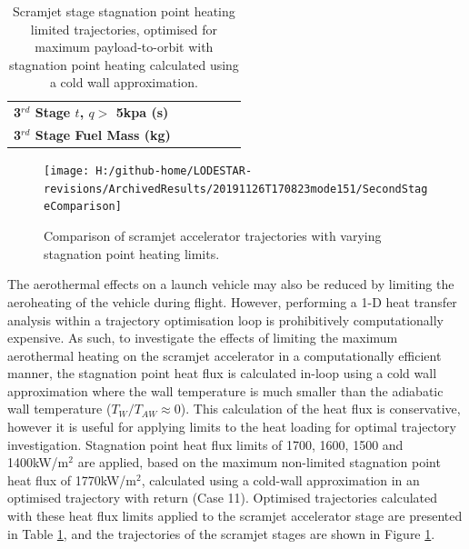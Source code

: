 \begin{table}[ht]
\begin{tabular}{l c c c c c }
		\textbf{3$^{rd}$ Stage $t$, $q >$ 5kpa (s)}
		& \thirdqOverFiveheatLimStandard
		& \thirdqOverFiveheatLimSeventeenHundred
		& \thirdqOverFiveheatLimSixteenHundred
		& \thirdqOverFiveheatLimFifteenHundred
		& \thirdqOverFiveheatLimFourteenHundred
		\\
		\textbf{3$^{rd}$ Stage Fuel Mass (kg)}
		& \thirdmFuelheatLimStandard
		& \thirdmFuelheatLimSeventeenHundred
		& \thirdmFuelheatLimSixteenHundred
		& \thirdmFuelheatLimFifteenHundred
		& \thirdmFuelheatLimFourteenHundred
		\\
		\hline 
	\end{tabular} 
	\caption{Scramjet stage stagnation point heating limited trajectories, optimised for maximum payload-to-orbit with stagnation point heating calculated using a cold wall approximation. }
	\label{tab:stagLim}
\end{table}

\begin{figure}[!ht]
\centering
\texttt{[image: H:/github-home/LODESTAR-revisions/ArchivedResults/20191126T170823mode151/SecondStageComparison]}
\caption{Comparison of scramjet accelerator trajectories with varying stagnation point heating limits.}
\label{fig:SecondStageheatlimComparison}
\end{figure}


The aerothermal effects on a launch vehicle may also be reduced by limiting the aeroheating of the vehicle during flight. However, performing a 1-D heat transfer analysis within a trajectory optimisation loop is prohibitively computationally expensive. 
As such, to investigate the effects of limiting the maximum aerothermal heating on the scramjet accelerator in a computationally efficient manner, the stagnation point heat flux is calculated in-loop using a cold wall approximation where the wall temperature is much smaller than the adiabatic wall temperature ($T_W/T_{AW} \approx 0$)\cite{Dirkx}. This calculation of the heat flux is conservative, however it is useful for applying limits to the heat loading for optimal trajectory investigation. Stagnation point heat flux limits of 1700, 1600, 1500 and 1400kW/m$^2$ are applied, based on the maximum non-limited stagnation point heat flux of 1770kW/m$^2$, calculated using a cold-wall approximation in an optimised trajectory with return (Case 11). Optimised trajectories calculated with these heat flux limits applied to the scramjet accelerator stage are presented in Table \ref{tab:stagLim}, and the trajectories of the scramjet stages are shown in Figure \ref{fig:SecondStageheatlimComparison}. 

